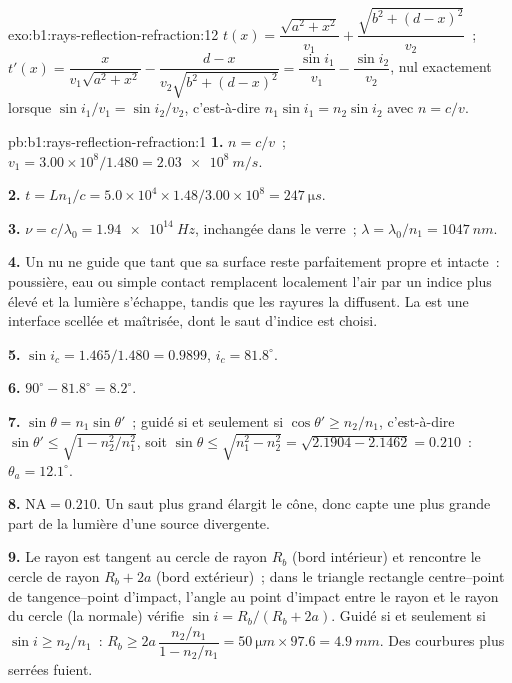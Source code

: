 \begin{solution}{exo:b1:rays-reflection-refraction:12}
$t(x) = \dfrac{\sqrt{a^2 + x^2}}{v_1} + \dfrac{\sqrt{b^2 + (d - x)^2}}{v_2}$~;
$t'(x) = \dfrac{x}{v_1\sqrt{a^2 + x^2}} - \dfrac{d - x}{v_2\sqrt{b^2 + (d - x)^2}}
= \dfrac{\sin i_1}{v_1} - \dfrac{\sin i_2}{v_2}$, nul exactement lorsque
$\sin i_1/v_1 = \sin i_2/v_2$, c'est-à-dire $n_1\sin i_1 = n_2\sin i_2$ avec
$n = c/v$.
\end{solution}

\begin{solution}{pb:b1:rays-reflection-refraction:1}
\textbf{1.} $n = c/v$~; $v_1 = 3.00\times10^8/1.480 = \qty{2.03e8}{m/s}$.

\textbf{2.} $t = Ln_1/c = 5.0\times10^4 \times 1.48/3.00\times10^8 =
\qty{247}{\micro s}$.

\textbf{3.} $\nu = c/\lambda_0 = \qty{1.94e14}{Hz}$, inchangée dans le verre~;
$\lambda = \lambda_0/n_1 = \qty{1047}{nm}$.

\textbf{4.} Un  nu ne guide que tant que sa surface reste
parfaitement propre et intacte~: poussière, eau ou simple contact
remplacent localement l'air par un indice plus élevé et la lumière
s'échappe, tandis que les rayures la diffusent. La  est une
interface scellée et maîtrisée, dont le saut d'indice est choisi.

\textbf{5.} $\sin i_c = 1.465/1.480 = 0.9899$, $i_c = 81.8^\circ$.

\textbf{6.} $90^\circ - 81.8^\circ = 8.2^\circ$.

\textbf{7.} $\sin\theta = n_1\sin\theta'$~; guidé si et seulement si $\cos\theta' \geq
n_2/n_1$, c'est-à-dire $\sin\theta' \leq \sqrt{1 - n_2^2/n_1^2}$, soit
$\sin\theta \leq \sqrt{n_1^2 - n_2^2} = \sqrt{2.1904 - 2.1462} = 0.210$~:
$\theta_a = 12.1^\circ$.

\textbf{8.} $\mathrm{NA} = 0.210$. Un saut plus grand élargit le cône,
donc capte une plus grande part de la lumière d'une source divergente.

\textbf{9.} Le rayon est tangent au cercle de rayon $R_b$ (bord
intérieur) et rencontre le cercle de rayon $R_b + 2a$ (bord extérieur)~;
dans le triangle rectangle centre--point de tangence--point d'impact,
l'angle au point d'impact entre le rayon et le rayon du cercle (la
normale) vérifie $\sin i = R_b/(R_b + 2a)$. Guidé si et seulement si
$\sin i \geq n_2/n_1$~:
$R_b \geq 2a\,\dfrac{n_2/n_1}{1 - n_2/n_1} = \qty{50}{\micro m} \times 97.6
= \qty{4.9}{mm}$. Des courbures plus serrées fuient.


\end{solution}
